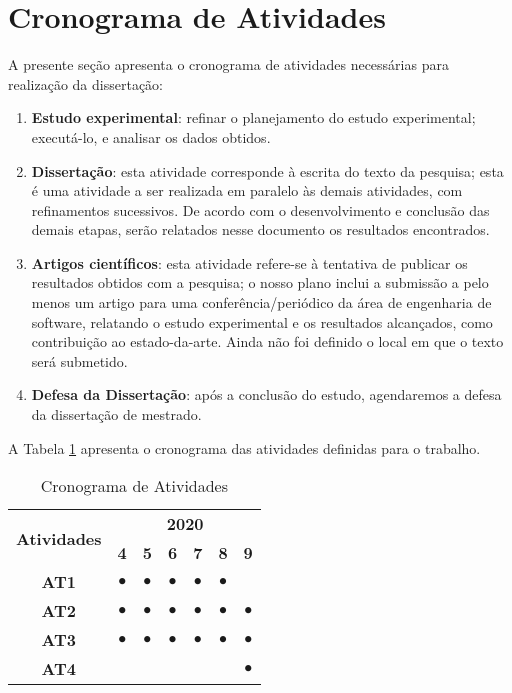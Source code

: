 \section{Cronograma de Atividades}

A presente seção apresenta o cronograma de atividades necessárias para realização da dissertação:

\begin{enumerate}[label=\bf AT\arabic*,leftmargin=1.7cm]

    \item \textbf{Estudo experimental}: refinar o planejamento do estudo experimental; executá-lo, e analisar os dados obtidos.
    
    \item \textbf{Dissertação}: esta atividade corresponde à escrita do texto da pesquisa; esta é uma atividade a ser realizada em paralelo às demais atividades, com refinamentos sucessivos. De acordo com o desenvolvimento e conclusão das demais etapas, serão relatados nesse documento os resultados encontrados.
    
    \item \textbf{Artigos científicos}: esta atividade refere-se à tentativa de publicar os resultados obtidos com a pesquisa; o nosso plano inclui a submissão a pelo menos um artigo para uma conferência/periódico da área de engenharia de software, relatando o estudo experimental e os resultados alcançados, como contribuição ao estado-da-arte. Ainda não foi definido o local em que o texto será submetido.
    
    \item \textbf{Defesa da Dissertação}: após a conclusão do estudo, agendaremos a defesa da dissertação de mestrado. 

\end{enumerate}

A Tabela \ref{tabela_cronograma} apresenta o cronograma das atividades definidas para o trabalho.

\begin{table}[ht]
    \centering
    \footnotesize
    \def \arraystretch{1.0}
    \caption{Cronograma de Atividades}
    \begin{tabular}{|c|c|c|c|c|c|c|}
        \hline
        \multirow{2}{*}{\bf Atividades} &  \multicolumn{6}{c|}{\bf 2020} \\ \cline{2-9} 
        & \bf 4 & \bf 5 & \bf 6 & \bf 7 & \bf 8 & \bf 9 \\  
        \hline
        \bf AT1 & $\bullet$ & $\bullet$ & $\bullet$ & $\bullet$ & $\bullet$ & \\
        \hline
        \bf AT2 & $\bullet$ & $\bullet$ & $\bullet$ & $\bullet$ & $\bullet$ & $\bullet$ \\
        \hline
        \bf AT3 & $\bullet$ & $\bullet$ & $\bullet$ & $\bullet$ & $\bullet$ & $\bullet$ \\
        \hline
        \bf AT4 &  &  &  &  &  & $\bullet$ \\
        \hline
    \end{tabular}
    \label{tabela_cronograma}
\end{table}